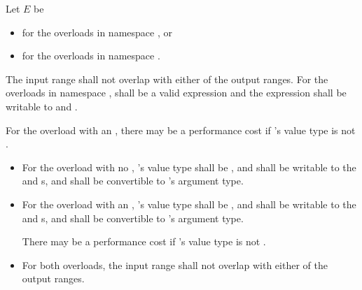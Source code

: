 \begin{itemdescr}
\begin{newnewblock}
\pnum
Let $E$ be
\begin{itemize}
\item {} for the overloads in namespace , or
\item {} for the overloads in
  namespace .
\end{itemize}

\pnum
\requires
The input range shall not overlap with either of the output ranges.
For the overloads in namespace ,
 shall be a valid expression and
the expression  shall be
writable to
 and .
\begin{note}
For the overload with an ,
there may be a performance cost if 's value type is not
.
\end{note}
\end{newnewblock}

\begin{oldoldblock}
\begin{itemize}
\item
For the overload with no , 's
value type shall be ,
and shall be writable to the 
and  s, and shall be convertible to
's argument type.

\item
For the overload with an , 's
value type shall be , and shall be writable to the
 and  s, and shall be
convertible to 's argument type.
\begin{note}
There may be a performance cost if 's value type is not
.
\end{note}

\item
For both overloads, the input range shall not overlap with either of the output ranges.
\end{itemize}
\end{oldoldblock}


\end{itemdescr}
